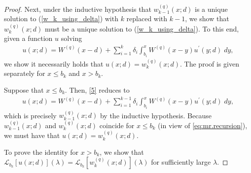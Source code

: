 \documentclass[12pt,reqno]{amsart}
\newcommand{\red}{\textcolor[rgb]{1.00,0.00,0.00}}
\newcommand{\blue}{\textcolor[rgb]{0.00,0.00,1.00}}
\theoremstyle{definition}
\theoremstyle{remark}
\begin{document}
\begin{proof}
 Next, under the inductive hypothesis that $w_{k-1}^{(q)}(x;d)$ is a unique solution to (\ref{w_k_using_delta}) with $k$ replaced with $k-1$, we show that $w_k^{(q)}(x;d)$ must be a unique solution to (\ref{w_k_using_delta}). To this end, given a function $u$ solving
\begin{align}\label{5}
u(x;d)=W^{(q)}(x-d)+\sum_{i=1}^k\delta_i\int_{b_i}^xW^{(q)}(x-y)u^{\prime}(y;d)\;dy,
\end{align}
we show it necessarily holds that  $u(x;d) = w_k^{(q)}(x;d)$. The proof is given separately for $x \leq b_k$ and $x > b_k$. 

Suppose that $x \leq b_k$. Then, \eqref{5} reduces to 
\begin{align*}
u(x;d)=W^{(q)}(x-d)+\sum_{i=1}^{k-1}\delta_i\int_{b_i}^xW^{(q)}(x-y)u^{\prime}(y;d)\;dy,
\end{align*}
which is precisely $w_{k-1}^{(q)}(x;d)$ by the inductive hypothesis. Because $w_{k-1}^{(q)}(x;d)$ and $w_{k}^{(q)}(x;d)$ coincide for $x \leq b_k$ 
(in view of \eqref{eq:mr.recursion}), we must have that  $u(x;d) = w_k^{(q)}(x;d)$. 

To prove the identity for $x > b_k$, we show that $\mathcal{L}_{b_k}[u(x;d)](\lambda)=\mathcal{L}_{b_k}[w_{k}^{(q)}(x;d)](\lambda)$  for sufficiently large $\lambda$.





\end{proof}
\end{document}
